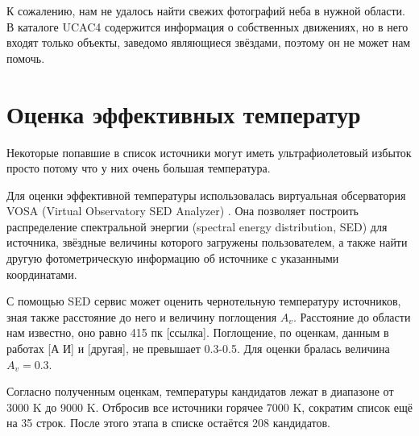 К сожалению, нам не удалось найти свежих фотографий неба в нужной области. 
В каталоге UCAC4 содержится информация о собственных движениях, но в него входят только объекты, заведомо являющиеся звёздами, поэтому он не может нам помочь.


\section{Оценка эффективных температур}
Некоторые попавшие в список источники могут иметь ультрафиолетовый избыток просто потому что у них очень большая температура. 

Для оценки эффективной температуры использовалась виртуальная обсерватория VOSA (Virtual Observatory SED Analyzer) \cite{bayo2008vosa}. Она позволяет построить распределение спектральной энергии (spectral energy distribution, SED) для источника, звёздные величины которого загружены пользователем, а также найти другую фотометрическую информацию об источнике с указанными координатами.

С помощью SED сервис может оценить чернотельную температуру источников, зная также расстояние до него и величину поглощения $A_v$. Расстояние до области нам известно, оно равно 415 пк [ссылка]. Поглощение, по оценкам, данным в работах [А И] и [другая], не превышает 0.3-0.5. Для оценки бралась величина $A_v=0.3$.

Согласно полученным оценкам, температуры кандидатов лежат в диапазоне от 3000 K до 9000 K. Отбросив все источники горячее 7000 K, сократим список ещё на 35 строк. После этого этапа в списке остаётся 208 кандидатов.


